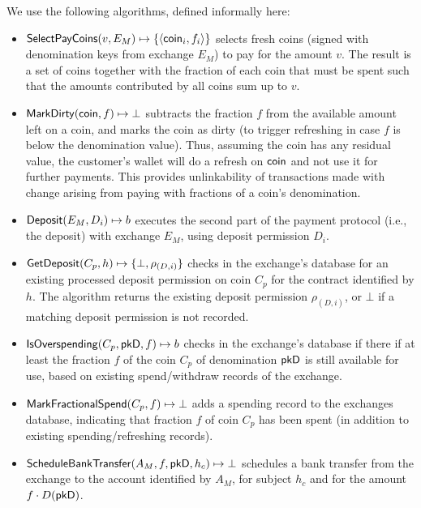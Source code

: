 We use the following algorithms, defined informally here:
\begin{itemize}
 \item $\mathsf{SelectPayCoins}(v, E_M) \mapsto \{ \langle \mathsf{coin}_i, f_i \rangle \}$ selects
   fresh coins (signed with denomination keys from exchange $E_M$)
   to pay for the amount $v$.  The result is a set of coins
   together with the fraction of each coin that must be spent such that
   the amounts contributed by all coins sum up to $v$.
 \item $\mathsf{MarkDirty}(\mathsf{coin}, f) \mapsto \bot$ subtracts the fraction $f$ from the
   available amount left on a coin, and marks the coin as dirty (to trigger refreshing
   in case $f$ is below the denomination value).  Thus, assuming the coin has
   any residual value, the customer's wallet will do a refresh on $\mathsf{coin}$
   and not use it for further payments.  This provides unlinkability of transactions
   made with change arising from paying with fractions of a coin's denomination.
 \item $\mathsf{Deposit}(E_M, D_i) \mapsto b$ executes the second part of the payment protocol
   (i.e., the deposit) with exchange $E_M$, using deposit permission $D_i$.
 \item $\mathsf{GetDeposit}(C_p, h) \mapsto \{\bot,\rho_{(D,i)}\}$ checks in the exchange's database
    for an existing processed deposit permission on coin $C_p$ for the contract
    identified by $h$.  The algorithm returns the existing deposit permission $\rho_{(D,i)}$, or $\bot$ if a
    matching deposit permission is not recorded.
 \item $\mathsf{IsOverspending}(C_p, \mathsf{pkD}, f) \mapsto b$ checks in the exchange's database
   if there if at least the fraction $f$ of the coin $C_p$ of denomination $\mathsf{pkD}$ is still available
   for use, based on existing spend/withdraw records of the exchange.
 \item $\mathsf{MarkFractionalSpend}(C_p, f) \mapsto \bot$ adds a spending
   record to the exchanges database, indicating
   that fraction $f$ of coin $C_p$ has been spent (in addition to
   existing spending/refreshing records).
 \item $\mathsf{ScheduleBankTransfer}(A_M, f, \mathsf{pkD}, h_c) \mapsto \bot$
   schedules a bank transfer from the exchange to
   the account identified by $A_M$, for subject $h_c$ and for the amount $f\cdot D(\mathsf{pkD})$.
\end{itemize}


